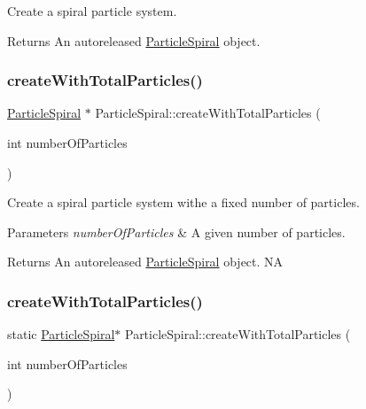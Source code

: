 Create a spiral particle system.

\begin{DoxyReturn}{Returns}
An autoreleased \hyperlink{classParticleSpiral}{Particle\+Spiral} object. 
\end{DoxyReturn}
\mbox{\label{classParticleSpiral_a97e226600f4bfced04176e665f8c6e27}} 
\subsubsection{\texorpdfstring{create\+With\+Total\+Particles()}{createWithTotalParticles()}\hspace{0.1cm}{\footnotesize\ttfamily [1/2]}}
{\footnotesize\ttfamily \hyperlink{classParticleSpiral}{Particle\+Spiral} $\ast$ Particle\+Spiral\+::create\+With\+Total\+Particles (\begin{DoxyParamCaption}\item[{int}]{number\+Of\+Particles }\end{DoxyParamCaption})\hspace{0.3cm}{\ttfamily [static]}}

Create a spiral particle system withe a fixed number of particles.


\begin{DoxyParams}{Parameters}
{\em number\+Of\+Particles} & A given number of particles. \\
\hline
\end{DoxyParams}
\begin{DoxyReturn}{Returns}
An autoreleased \hyperlink{classParticleSpiral}{Particle\+Spiral} object.  NA 
\end{DoxyReturn}
\mbox{\label{classParticleSpiral_ace847f71cef983bde3f64dae6a6946a6}} 
\subsubsection{\texorpdfstring{create\+With\+Total\+Particles()}{createWithTotalParticles()}\hspace{0.1cm}{\footnotesize\ttfamily [2/2]}}
{\footnotesize\ttfamily static \hyperlink{classParticleSpiral}{Particle\+Spiral}$\ast$ Particle\+Spiral\+::create\+With\+Total\+Particles (\begin{DoxyParamCaption}\item[{int}]{number\+Of\+Particles }\end{DoxyParamCaption})\hspace{0.3cm}{\ttfamily [static]}}

